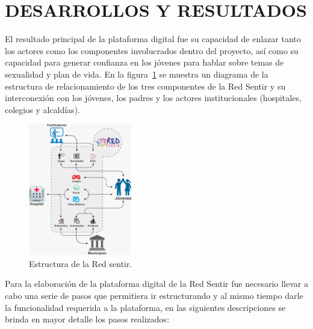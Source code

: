 \documentclass[journal,transmag]{IEEEtran}
\begin{document}
\section{DESARROLLOS Y RESULTADOS}\label{sec:resultados}

El resultado principal de la plataforma digital fue su capacidad de enlazar tanto los actores como los componentes involucrados dentro del proyecto, así como su capacidad para generar confianza en los jóvenes para hablar sobre temas de sexualidad y plan de vida. En la figura~\ref{fig:estructura} se muestra un diagrama de la estructura de relacionamiento de los tres componentes de la Red Sentir y su interconexión con los jóvenes, los padres y los actores institucionales (hospitales, colegios y alcaldías). 

\begin{figure}[t]
\centering
\includegraphics[width=0.4\textwidth]{plataforma_relacion.jpeg}
\caption{Estructura de la Red sentir.}
\label{fig:estructura}
\end{figure}

Para la elaboración de la plataforma digital de la Red Sentir fue necesario llevar a cabo una serie de pasos que permitiera ir estructurando y al mismo tiempo darle la funcionalidad requerida a la plataforma, en las siguientes descripciones se brinda en mayor detalle los pasos realizados:
\end{document}
